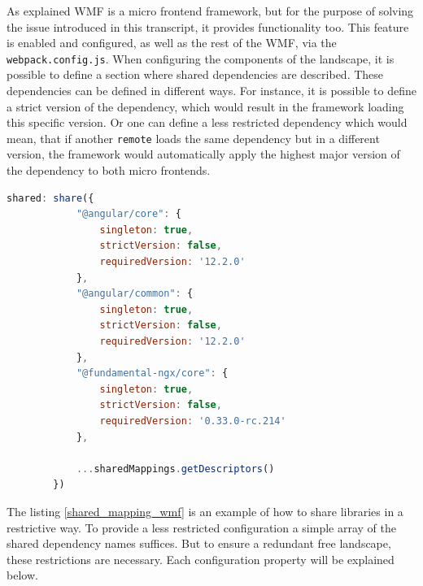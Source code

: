As explained WMF is a micro frontend framework, but for the purpose of solving the issue introduced in this transcript, it provides functionality too.
This feature is enabled and configured, as well as the rest of the WMF, via the \texttt{webpack.config.js}. When configuring the components of the landscape, it is possible to define a section where shared dependencies are described. These dependencies can be defined in different ways. For instance, it is possible to define a strict version of the dependency, which would result in the framework loading this specific version. Or one can define a less restricted dependency which would mean, that if another \texttt{remote} loads the same dependency but in a different version, the framework would automatically apply the highest major version of the dependency to both micro frontends.
\newpage
\begin{lstlisting}[language=JavaScript, caption=Example of sharing dependencies configured in the \texttt{webpack.config.js}, label=shared_mapping_wmf]
	  shared: share({
			"@angular/core": { 
				singleton: true, 
				strictVersion: false, 
				requiredVersion: '12.2.0' 
			},
			"@angular/common": { 
				singleton: true, 
				strictVersion: false, 
				requiredVersion: '12.2.0' 
			},
			"@fundamental-ngx/core": { 
				singleton: true, 
				strictVersion: false, 
				requiredVersion: '0.33.0-rc.214' 
			},
			
			...sharedMappings.getDescriptors()
		})
\end{lstlisting}

The listing \ref{shared_mapping_wmf} is an example of how to share libraries in a restrictive way. To provide a less restricted configuration a simple array of the shared dependency names suffices. But to ensure a redundant free landscape, these restrictions are necessary. Each configuration property will be explained below.

